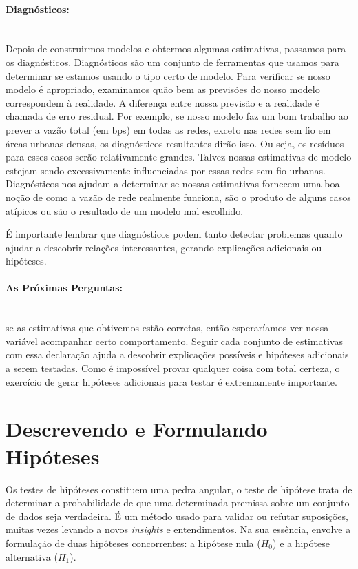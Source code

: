 \documentclass[article]{memoir}
\begin{document}
\paragraph*{Diagnósticos:}\mbox{}\\
Depois de construirmos modelos e obtermos algumas estimativas, passamos para os diagnósticos. Diagnósticos são um conjunto de ferramentas que usamos para determinar se estamos usando o tipo certo de modelo. Para verificar se nosso modelo é apropriado, examinamos quão bem as previsões do nosso modelo correspondem à realidade. A diferença entre nossa previsão e a realidade é chamada de erro residual. Por exemplo, se nosso modelo faz um bom trabalho ao prever a vazão total (em bps) em todas as redes, exceto nas redes sem fio em áreas urbanas densas, os diagnósticos resultantes dirão isso. Ou seja, os resíduos para esses casos serão relativamente grandes. Talvez nossas estimativas de modelo estejam sendo excessivamente influenciadas por essas redes sem fio urbanas. Diagnósticos nos ajudam a determinar se nossas estimativas fornecem uma boa noção de como a vazão de rede realmente funciona, são o produto de alguns casos atípicos ou são o resultado de um modelo mal escolhido.

É importante lembrar que diagnósticos podem tanto detectar problemas quanto ajudar a descobrir relações interessantes, gerando explicações adicionais ou hipóteses. 

\paragraph*{As Próximas Perguntas:}\mbox{}\\
 se as estimativas que obtivemos estão corretas, então esperaríamos ver nossa variável acompanhar certo comportamento. Seguir cada conjunto de estimativas com essa declaração ajuda a descobrir explicações possíveis e hipóteses adicionais a serem testadas. Como é impossível provar qualquer coisa com total certeza, o exercício de gerar hipóteses adicionais para testar é extremamente importante. 

\section{Descrevendo e Formulando Hipóteses}

Os testes de hipóteses constituem uma pedra angular, o teste de hipótese trata de determinar a probabilidade de que uma determinada premissa sobre um conjunto de dados seja verdadeira. É um método usado para validar ou refutar suposições, muitas vezes levando a novos \textit{insights} e entendimentos. Na sua essência, envolve a formulação de duas hipóteses concorrentes: a hipótese nula ($H_0$) e a hipótese alternativa ($H_1$).
\end{document}
